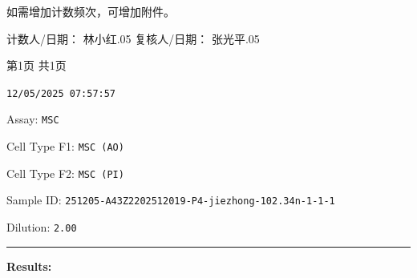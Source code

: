 \documentclass[UTF8,10pt,a4paper,fontset=fandol]{ctexart}
\newcommand{\fieldvalue}[1]{#1}
\newcommand{\handwritten}[1]{#1}
\begin{document}
\vspace{0.5em}

如需增加计数频次，可增加附件。

\vspace{0.5em}

\noindent
计数人/日期：
\fieldvalue{\handwritten{林小红.05}}
\hfill
复核人/日期：
\fieldvalue{\handwritten{张光平.05}}

\begin{center}
第1页 共1页
\end{center}

\newpage

\begin{flushright}
\fieldvalue{\texttt{12/05/2025 07:57:57}}
\end{flushright}

\noindent
Assay:
\fieldvalue{\texttt{MSC}}

\noindent
Cell Type F1:
\fieldvalue{\texttt{MSC (AO)}}

\noindent
Cell Type F2:
\fieldvalue{\texttt{MSC (PI)}}

\vspace{1em}

\noindent
Sample ID:
\fieldvalue{\texttt{251205-A43Z2202512019-P4-jiezhong-102.34n-1-1-1}}

\noindent
Dilution:
\fieldvalue{\texttt{2.00}}

\vspace{1em}
\hrule
\vspace{1em}

\noindent\textbf{Results:}

\vspace{0.5em}
\end{document}
